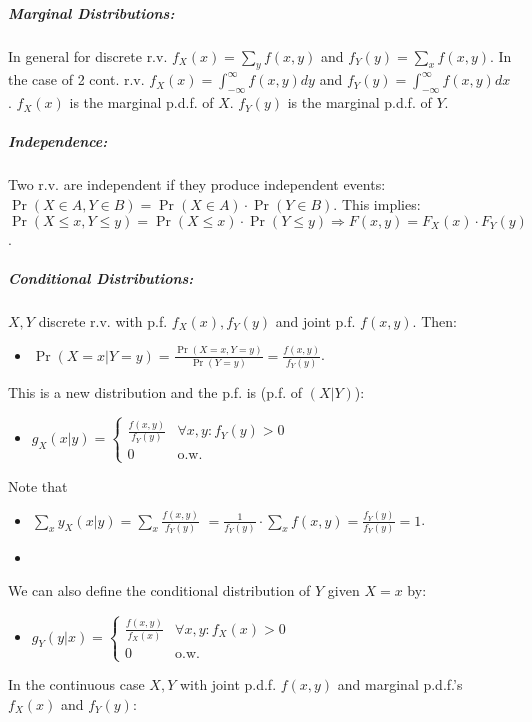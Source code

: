 \documentclass[landscape,10pt]{article}
\begin{document}
\begin{multicols}{4}
    \subparagraph*{Marginal Distributions: }
        In general for discrete r.v. \(f_X(x) = \sum_{y}f(x,y)\) and \(f_Y(y) = \sum_{x}f(x,y)\). In the case of 2 cont. r.v. \(f_X(x) = \int_{-\infty}^{\infty}f(x,y)dy\) and \(f_Y(y) = \int_{-\infty}^{\infty}f(x,y)dx\). \(f_X(x)\) is the marginal p.d.f. of \(X\). \(f_Y(y)\) is the marginal p.d.f. of \(Y\).

    \subparagraph*{Independence: }
        Two r.v. are independent if they produce independent events: \(\Pr(X \in A, Y \in B) = \Pr(X \in A) \cdot \Pr(Y \in B)\). This implies: \(\Pr(X \leq x, Y \leq y) = \Pr(X \leq x) \cdot \Pr(Y \leq y) \Rightarrow F(x,y) = F_X(x) \cdot F_Y(y)\).

    \subparagraph*{Conditional Distributions: }
        \(X, Y\) discrete r.v. with p.f. \(f_X(x), f_Y(y)\) and joint p.f. \(f(x,y)\). Then:
        \begin{itemize}
            \item[] \(\Pr(X = x | Y = y) = \frac{\Pr(X = x, Y = y)}{\Pr(Y = y)} = \frac{f(x,y)}{f_Y(y)}\).
        \end{itemize}
        This is a new distribution and the p.f. is (p.f. of \((X|Y)\)):
        \begin{itemize}
            \item[] \(g_X(x|y) = \begin{cases} \frac{f(x,y)}{f_Y(y)} & \forall x,y: f_Y(y) > 0 \\ 0 & \text{o.w.}\end{cases}\)
        \end{itemize}
        Note that 
        \begin{itemize}
            \item[] \(\sum_x{y_X(x|y)} = \sum_x{\frac{f(x,y)}{f_Y(y)}} \)
             \(= \frac{1}{f_Y(y)} \cdot \sum_x{f(x,y)} = \frac{f_Y(y)}{f_Y(y)} = 1\). 
            \item[]
        \end{itemize}
    We can also define the conditional distribution of \(Y\) given \(X=x\) by:
        \begin{itemize}
            \item[] \(g_Y(y|x) = \begin{cases} \frac{f(x,y)}{f_X(x)} & \forall x,y: f_X(x) > 0 \\ 0 & \text{o.w.} \end{cases}\)
        \end{itemize}
    In the continuous case \(X, Y\) with joint p.d.f. \(f(x,y)\) and marginal p.d.f.'s \(f_X(x)\) and \(f_Y(y)\): 

\end{multicols}
\end{document}
